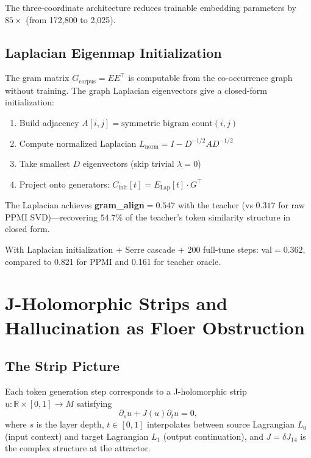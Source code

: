 \documentclass[11pt,a4paper]{article}
\begin{document}
The three-coordinate architecture reduces trainable embedding parameters by
$85{\times}$ (from 172,800 to 2,025).

\subsection{Laplacian Eigenmap Initialization}

The gram matrix $G_\text{corpus} = E E^\top$ is computable from the
co-occurrence graph without training.  The graph Laplacian eigenvectors
give a closed-form initialization:

\begin{enumerate}
  \item Build adjacency $A[i,j] = \text{symmetric bigram count}(i,j)$
  \item Compute normalized Laplacian $L_\text{norm} = I - D^{-1/2}AD^{-1/2}$
  \item Take smallest $D$ eigenvectors (skip trivial $\lambda{=}0$)
  \item Project onto generators: $C_\text{init}[t] = E_\text{Lap}[t] \cdot G^\top$
\end{enumerate}

The Laplacian achieves \textbf{gram\_align}${=}0.547$ with the teacher
(vs $0.317$ for raw PPMI SVD)---recovering $54.7\%$ of the teacher's token
similarity structure in closed form.

With Laplacian initialization + Serre cascade + 200 full-tune steps:
val${=}0.362$, compared to 0.821 for PPMI and 0.161 for teacher oracle.

\section{J-Holomorphic Strips and Hallucination as Floer Obstruction}
\label{sec:floer}

\subsection{The Strip Picture}

Each token generation step corresponds to a J-holomorphic strip
$u: \mathbb{R} \times [0,1] \to M$ satisfying
\[
\partial_s u + J(u)\partial_t u = 0,
\]
where $s$ is the layer depth, $t \in [0,1]$ interpolates between source
Lagrangian $L_0$ (input context) and target Lagrangian $L_1$ (output
continuation), and $J = \delta J_{14}$ is the complex structure at the attractor.
\end{document}
